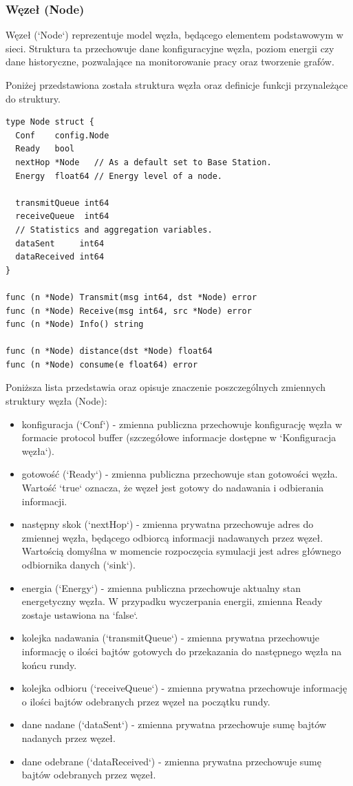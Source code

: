 \documentclass[a4paper,12pt,twoside,openany]{report}
\begin{document}
\subsubsection{Węzeł (Node)}

Węzeł (`Node`) reprezentuje model węzła, będącego elementem podstawowym w sieci. Struktura ta przechowuje dane konfiguracyjne węzła,
poziom energii czy dane historyczne, pozwalające na monitorowanie pracy oraz tworzenie grafów.

Poniżej przedstawiona została struktura węzła oraz definicje funkcji przynależące do struktury.

\begin{lstlisting}
type Node struct {
  Conf    config.Node
  Ready   bool
  nextHop *Node   // As a default set to Base Station.
  Energy  float64 // Energy level of a node.

  transmitQueue int64
  receiveQueue  int64
  // Statistics and aggregation variables.
  dataSent     int64
  dataReceived int64
}

func (n *Node) Transmit(msg int64, dst *Node) error
func (n *Node) Receive(msg int64, src *Node) error
func (n *Node) Info() string

func (n *Node) distance(dst *Node) float64
func (n *Node) consume(e float64) error
\end{lstlisting}

Poniższa lista przedstawia oraz opisuje znaczenie poszczególnych zmiennych struktury węzła (Node):

\begin{itemize}
 \item konfiguracja (`Conf`) - zmienna publiczna przechowuje konfigurację węzła w formacie protocol buffer (szczegółowe informacje dostępne w `Konfiguracja węzła`).
 \item gotowość (`Ready`) - zmienna publiczna przechowuje stan gotowości węzła. Wartość `true` oznacza, że węzeł jest gotowy do nadawania i odbierania informacji.
 \item następny skok (`nextHop`) - zmienna prywatna przechowuje adres do zmiennej węzła, będącego odbiorcą informacji nadawanych przez węzeł. Wartością domyślna w momencie
       rozpoczęcia symulacji jest adres głównego odbiornika danych (`sink`).
 \item energia (`Energy`) - zmienna publiczna przechowuje aktualny stan energetyczny węzła. W przypadku wyczerpania energii, zmienna Ready zostaje ustawiona na `false`.
 \item kolejka nadawania (`transmitQueue`) - zmienna prywatna przechowuje informację o ilości bajtów gotowych do przekazania do następnego węzła na końcu rundy.
 \item kolejka odbioru (`receiveQueue`) - zmienna prywatna przechowuje informację o ilości bajtów odebranych przez węzeł na początku rundy.
 \item dane nadane (`dataSent`) - zmienna prywatna przechowuje sumę bajtów nadanych przez węzeł.
 \item dane odebrane (`dataReceived`) - zmienna prywatna przechowuje sumę bajtów odebranych przez węzeł.
\end{itemize}
\end{document}
